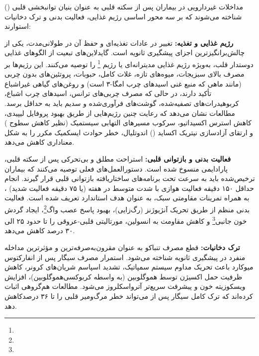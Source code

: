 مداخلات غیردارویی در بیماران پس از سکته قلبی به عنوان بنیان توانبخشی قلبی () شناخته می‌شوند که بر سه محور اساسی رژیم غذایی، فعالیت بدنی و ترک دخانیات استوارند:

\textbf{رژیم غذایی و تغذیه:} تغییر در عادات تغذیه‌ای و حفظ آن در طولانی‌مدت، یکی از چالش‌برانگیزترین اجزای پیشگیری ثانویه است. گایدلاین‌های  تبعیت از الگوهای غذایی دوستدار قلب، به‌ویژه رژیم غذایی مدیترانه‌ای یا رژیم \footnote{} را توصیه می‌کنند\cite{Virani2023ChronicCoronary,Estruch2018Mediterranean}. این رژیم‌ها بر مصرف بالای سبزیجات، میوه‌های تازه، غلات کامل، حبوبات، پروتئین‌های بدون چربی (مانند ماهی که منبع غنی اسیدهای چرب امگا-۳ است) و روغن‌های گیاهی غیراشباع تأکید دارند، در حالی که مصرف چربی‌های ترانس، اسیدهای چرب اشباع، کربوهیدرات‌های تصفیه‌شده، گوشت‌های فرآوری‌شده و سدیم باید به حداقل برسد\cite{Estruch2018Mediterranean}. مطالعات نشان می‌دهد که رعایت چنین رژیم‌هایی از طریق بهبود پروفایل لیپیدی، کاهش استرس اکسیداتیو، سرکوب مسیرهای التهابی سیستمیک (نظیر کاهش سطوح ) و ارتقای آزادسازی نیتریک اکساید () اندوتلیال، خطر حوادث ایسکمیک مکرر را به شکل معناداری کاهش می‌دهد\cite{Estruch2018Mediterranean}.

\textbf{فعالیت بدنی و بازتوانی قلبی: } استراحت مطلق و بی‌تحرکی پس از سکته قلبی، پارادایمی منسوخ شده است. دستورالعمل‌های فعلی توصیه می‌کنند که بیماران ترخیص‌شده باید به سرعت تحت برنامه‌های ساختاریافته بازتوانی قلبی قرار گیرند\cite{Virani2023ChronicCoronary}. انجام حداقل ۱۵۰ دقیقه فعالیت هوازی با شدت متوسط در هفته (یا ۷۵ دقیقه فعالیت شدید) ، به همراه تمرینات مقاومتی سبک، به عنوان هدف استاندارد تعریف شده است\cite{Virani2023ChronicCoronary}. فعالیت بدنی منظم از طریق تحریک آنژیوژنز (رگ‌زایی)، بهبود پاسخ عصب واگ\footnote{}، ایجاد گردش خون جانبی\footnote{} و کاهش مقاومت به انسولین، مورتالیتی قلبی-عروقی را تا حدود ۲۵ الی ۳۰ درصد کاهش می‌دهد\cite{Virani2023ChronicCoronary,Kotseva2019EUROASPIRE}.

\textbf{ترک دخانیات:} قطع مصرف تنباکو به عنوان مقرون‌به‌صرفه‌ترین و مؤثرترین مداخله منفرد در پیشگیری ثانویه شناخته می‌شود. استمرار مصرف سیگار پس از انفارکتوس میوکارد باعث تحریک مداوم سیستم سمپاتیک، تشدید اسپاسم شریان‌های کرونر، کاهش ظرفیت حمل اکسیژن توسط هموگلوبین (به واسطه کربوکسی‌هموگلوبین)، افزایش ویسکوزیته خون و پیشرفت سریع‌تر آترواسکلروز می‌شود\cite{Gao2025SmokingCessation}.  مطالعات هم‌گروهی اثبات کرده‌اند که ترک کامل سیگار پس از  می‌تواند خطر مرگ‌ومیر قلبی را تا ۳۶ درصدکاهش دهد\cite{Gao2025SmokingCessation}.

